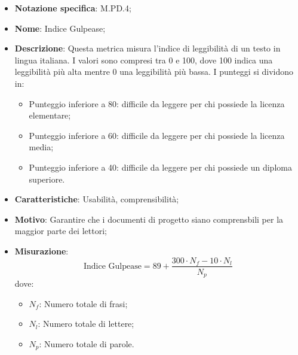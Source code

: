 \begin{itemize}
    \item \textbf{Notazione specifica}: M.PD.4;
    \item \textbf{Nome}: Indice Gulpease;
    \item \textbf{Descrizione}: Questa metrica misura l'indice di leggibilità di un testo in lingua italiana. I valori sono compresi tra 0 e 100, dove 100 indica una leggibilità più alta mentre 0 una leggibilità più bassa. I punteggi si dividono in:
    \begin{itemize}
        \item Punteggio inferiore a 80: difficile da leggere per chi possiede la licenza elementare;
        \item Punteggio inferiore a 60: difficile da leggere per chi possiede la licenza media;
        \item Punteggio inferiore a 40: difficile da leggere per chi possiede un diploma superiore.
    \end{itemize}
    \item \textbf{Caratteristiche}: Usabilità, comprensibilità;
    \item \textbf{Motivo}: Garantire che i documenti di progetto siano comprensbili per la maggior parte dei lettori;
    \item \textbf{Misurazione}:
    \[
        \text{Indice Gulpease} = 89 + \frac{{300 \cdot {{N_f}} - 10 \cdot {{N_l}}}}{{{{N_p}}}}
    \]
    dove:
    \begin{itemize}
        \item $N_{f}$: Numero totale di frasi;
        \item $N_{l}$: Numero totale di lettere;
        \item $N_{p}$: Numero totale di parole.
    \end{itemize}
\end{itemize}
